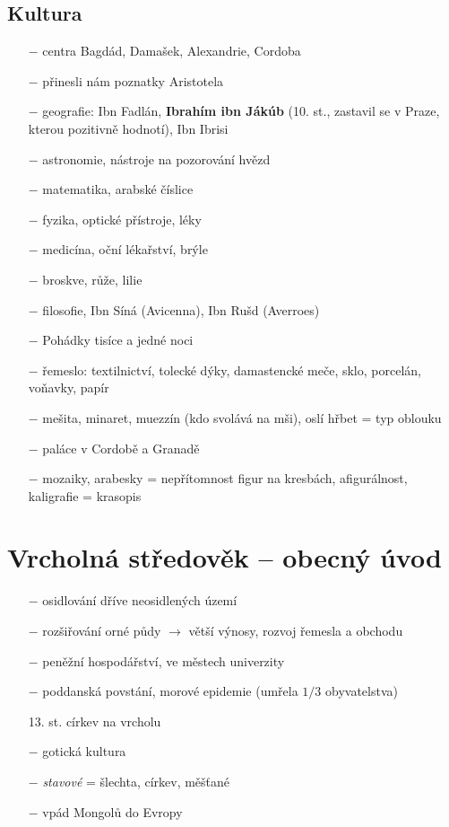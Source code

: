 \documentclass{article}
\begin{document}
\subsection*{Kultura}
\begin{itemize}
    \vspace{-0.5em}
    \setlength\itemsep{0.15em}
    \item[$-$] centra Bagdád, Damašek, Alexandrie, Cordoba
    \item[$-$] přinesli nám poznatky Aristotela
    \item[$-$] geografie: Ibn Fadlán, \textbf{Ibrahím ibn Jákúb} (10. st., zastavil se v Praze, kterou pozitivně hodnotí), Ibn Ibrisi
    \item[$-$] astronomie, nástroje na pozorování hvězd
    \item[$-$] matematika, arabské číslice
    \item[$-$] fyzika, optické přístroje, léky
    \item[$-$] medicína, oční lékařství, brýle
    \item[$-$] broskve, růže, lilie
    \item[$-$] filosofie, Ibn Síná (Avicenna), Ibn Rušd (Averroes)
    \item[$-$] Pohádky tisíce a jedné noci
    \item[$-$] řemeslo: textilnictví, tolecké dýky, damastencké meče, sklo, porcelán, voňavky, papír
    \item[$-$] mešita, minaret, muezzín (kdo svolává na mši), oslí hřbet = typ oblouku
    \item[$-$] paláce v Cordobě a Granadě
    \item[$-$] mozaiky, arabesky = nepřítomnost figur na kresbách, afigurálnost, kaligrafie = krasopis
\end{itemize}

\section*{Vrcholná středověk -- obecný úvod}
\begin{itemize}
    \vspace{-0.5em}
    \setlength\itemsep{0.15em}
    \item[$-$] osidlování dříve neosidlených území
    \item[$-$] rozšiřování orné půdy $\rightarrow$ větší výnosy, rozvoj řemesla a obchodu
    \item[$-$] peněžní hospodářství,  ve městech univerzity
    \item[$-$] poddanská povstání, morové epidemie (umřela $1 / 3$ obyvatelstva)
    \item[13. st.] církev na vrcholu
    \item[$-$] gotická kultura
    \item[$-$] \textit{stavové} = šlechta, církev, měšťané
    \item[$-$] vpád Mongolů do Evropy
\end{itemize}
\end{document}
